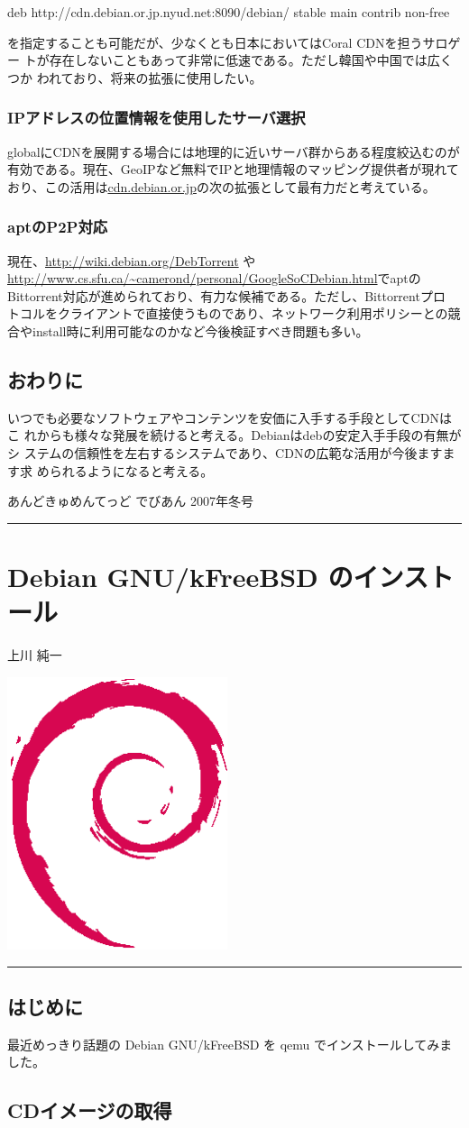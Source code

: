 \documentclass[mingoth,a4paper]{jsarticle}
\renewcommand{\dancersection}[2]{%
\newpage
あんどきゅめんてっど でびあん 2007年冬号
%
\vspace{0.1mm}\\
{\color{dancerlightblue}\rule{\hsize}{2mm}}

%
%
\begin{minipage}[t]{0.7\hsize}
\color{dancerdarkblue}
\vspace{1cm}
\section{#1}
\hfill{}#2\\
\end{minipage}
\begin{minipage}[t]{0.3\hsize}
\vspace{-2cm}
\hfill{}\includegraphics[height=8cm]{image200502/openlogo-nd.eps}\\
\vspace{-5cm}
\end{minipage}
%
%
{\color{dancerdarkblue}\rule{0.74\hsize}{2mm}}
%
\vspace{2cm}
}
\begin{document}
\begin{commandline}
 deb http://cdn.debian.or.jp.nyud.net:8090/debian/ stable main contrib non-free
\end{commandline}
を指定することも可能だが、少なくとも日本においてはCoral CDNを担うサロゲー
トが存在しないこともあって非常に低速である。ただし韓国や中国では広くつか
われており、将来の拡張に使用したい。

\subsubsection{IPアドレスの位置情報を使用したサーバ選択}

globalにCDNを展開する場合には地理的に近いサーバ群からある程度絞込むのが
有効である。現在、GeoIPなど無料でIPと地理情報のマッピング提供者が現れて
おり、この活用は\url{cdn.debian.or.jp}の次の拡張として最有力だと考えている。

\subsubsection{aptのP2P対応}

現在、\url{http://wiki.debian.org/DebTorrent} や
\url{http://www.cs.sfu.ca/~camerond/personal/GoogleSoCDebian.html}でaptの
Bittorrent対応が進められており、有力な候補である。ただし、Bittorrentプロ
トコルをクライアントで直接使うものであり、ネットワーク利用ポリシーとの競
合やinstall時に利用可能なのかなど今後検証すべき問題も多い。


\subsection{おわりに}

いつでも必要なソフトウェアやコンテンツを安価に入手する手段としてCDNはこ
れからも様々な発展を続けると考える。Debianはdebの安定入手手段の有無がシ
ステムの信頼性を左右するシステムであり、CDNの広範な活用が今後ますます求
められるようになると考える。


\dancersection{Debian GNU/kFreeBSD のインストール}{上川 純一}
\label{sec:debiankfreebsd}

\subsection{はじめに}

最近めっきり話題の Debian GNU/kFreeBSD を qemu でインストールしてみました。

\subsection{CDイメージの取得}
\end{document}
